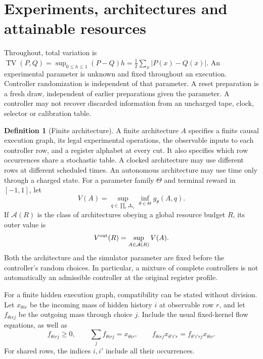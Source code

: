 \documentclass[11pt]{amsart}
\theoremstyle{definition}\newtheorem{definition}[theorem]{Definition}
\theoremstyle{remark}\newtheorem{remark}[theorem]{Remark}
\newcommand{\TV}{\operatorname{TV}}
\newcommand{\1}{\mathbf 1}
\newcommand{\cA}{\mathcal A}
\begin{document}

\section{Experiments, architectures and attainable resources}
\label{sec:model}
Throughout, total variation is
$\TV(P,Q)=\sup_{0\le h\le1}(P-Q)h=\frac12\sum_x|P(x)-Q(x)|$.
An experimental parameter is unknown and fixed throughout an execution.
Controller randomization is independent of that parameter. A reset
preparation is a fresh draw, independent of earlier preparations given
the parameter. A controller may not recover discarded information from
an uncharged tape, clock, selector or calibration table.

\begin{definition}[Finite architecture]
A finite architecture $A$ specifies a finite causal execution graph, its
legal experimental operations, the observable inputs to each controller
row, and a register alphabet at every cut. It also specifies which row
occurrences share a stochastic table. A clocked architecture may use
different rows at different scheduled times. An autonomous architecture
may use time only through a charged state. For a parameter family $\Theta$
and terminal reward in $[-1,1]$, let
\[
 V(A)=\sup_{q\in\prod_r\Delta_{s_r}}\inf_{\theta\in\Theta}
          g_\theta(A,q).
\]
If $\cA(R)$ is the class of architectures obeying a global resource budget
$R$, its outer value is
\[
 V^{\rm out}(R)=\sup_{A\in\cA(R)}V(A).
\]
Both the architecture and the simulator parameter are fixed before the
controller's random choices. In particular, a mixture of complete
controllers is not automatically an admissible controller at the original
register profile.
\end{definition}

For a finite hidden execution graph, compatibility can be stated without
division. Let $x_{\theta i r}$ be the incoming mass of hidden history $i$
at observable row $r$, and let $f_{\theta i r j}$ be the outgoing mass
through choice $j$. Include the usual fixed-kernel flow equations, as
well as
\begin{equation}\label{eq:occupation}
 f_{\theta i r j}\ge0,\qquad
 \sum_jf_{\theta i r j}=x_{\theta i r},\qquad
 f_{\theta i r j}x_{\theta'i'r}
 =f_{\theta'i'rj}x_{\theta i r}.
\end{equation}
For shared rows, the indices $i,i'$ include all their occurrences.
\end{document}
